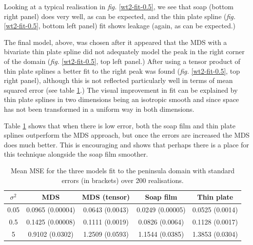 \documentclass[a4paper,10pt]{article}
\newcommand{\fig}[1]{\emph{fig.} \ref{#1}}
\begin{document}
Looking at a typical realisation in \fig{wt2-fit-0.5}, we see that soap (bottom right panel) does very well, as can be expected, and the thin plate spline (\fig{wt2-fit-0.5}, bottom left panel) fit shows leakage (again, as can be expected.) 

The final model, above, was chosen after it appeared that the MDS with a bivariate thin plate spline did not adequately model the peak in the right corner of the domain (\fig{wt2-fit-0.5}, top left panel.) After using a tensor product of thin plate splines a better fit to the right peak was found (\fig{wt2-fit-0.5}, top right panel), although this is not reflected particularly well in terms of mean squared error (see table \ref{wt2resultstable}.) The visual improvement in fit can be explained by thin plate splines in two dimensions being an isotropic smooth and since space has not been transformed in a uniform way in both dimensions.

Table \ref{wt2resultstable} shows that when there is low error, both the soap film and thin plate splines outperform the MDS approach, but once the errors are increased the MDS does much better. This is encouraging and shows that perhaps there is a place for this technique alongside the soap film smoother.

\begin{table}[ht]
\centering
\begin{tabular}{c || c c c c}
$\sigma^2$ & MDS & MDS (tensor) & Soap film & Thin plate\\ 
\hline
0.05 & 0.0965 (0.00004) & 0.0643 (0.0043) & 0.0249 (0.00005) & 0.0525 (0.0014)\\ 
0.5 & 0.1425 (0.00008) & 0.1111 (0.0019) & 0.0826 (0.0064) & 0.1128 (0.0017)\\ 
5 & 0.9102 (0.0302) & 1.2509 (0.0593) & 1.1544 (0.0385) & 1.3853 (0.0304)\\ 
\end{tabular}
\caption{Mean MSE for the three models fit to the peninsula domain with standard errors (in brackets) over 200 realisations.}
\label{wt2resultstable}
\end{table}
\end{document}
